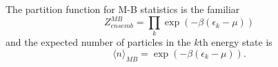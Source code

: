 The partition function for M-B statistics is the familiar
$$
	Z^{MB}_{ensemb} = \prod_k \exp(-\beta(\epsilon_k-\mu))
$$
and the expected number of particles in the $k$th energy state is
$$
\langle n\rangle_{MB} = \exp(-\beta(\epsilon_k-\mu)).
$$






